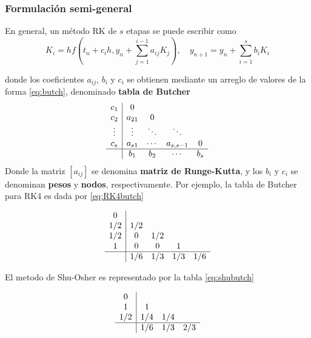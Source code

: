 
\subsubsection{Formulación semi-general}
En general, un método RK de $s$ etapas se puede escribir como
\begin{equation}
  K_{i} = hf\left( t_{n} + c_{i}h, y_{n} + \sum_{j = 1}^{i-1}a_{ij}K_{j} \right), \quad y_{n+1} = y_{n} + \sum_{i=1}^{s}b_{i}K_{i}
 \end{equation}

donde los coeficientes $a_{ij}$, $b_{i}$ y $c_{i}$ se obtienen mediante un arreglo de valores de la forma \eqref{eq:butch}, denominado \textbf{tabla de Butcher}
\begin{equation} \label{eq:butch}
  \begin{array}{c|c c c c}
    c_{1} & 0 &  &  &  \\
    c_{2} & a_{21} & 0 & & \\
    \vdots & \vdots & \ddots & \ddots & \\
    c_{s} & a_{s1} & \cdots & a_{s,s-1} & 0 \\
    \hline
    & b_{1} & b_{2} & \cdots & b_{s}
  \end{array} 
 \end{equation}
Donde la matriz $[a_{ij}]$ se denomina \textbf{matriz de Runge-Kutta}, y los $b_{i}$ y $c_{i}$ se denominan \textbf{pesos} y \textbf{nodos}, respectivamente. Por ejemplo, la tabla de Butcher para RK4 es dada por \eqref{eq:RK4butch}

\begin{equation} \label{eq:RK4butch}
  \begin{array}{c|c c c c}
    0 &  &  &  &  \\
    1/2 & 1/2 & & & \\
    1/2 & 0 & 1/2 & &  \\
    1 & 0 & 0 & 1 &  \\
    \hline
    & 1/6 & 1/3 & 1/3 & 1/6
  \end{array} 
 \end{equation}

El metodo de Shu-Osher es representado por la tabla \eqref{eq:shubutch}

\begin{equation} \label{eq:shubutch}
  \begin{array}{c|c c c }
    0 &  &  &  \\
    1 & 1 & & \\
    1/2 & 1/4 & 1/4 & \\
    \hline
    & 1/6 & 1/3 & 2/3 
  \end{array} 
 \end{equation}

